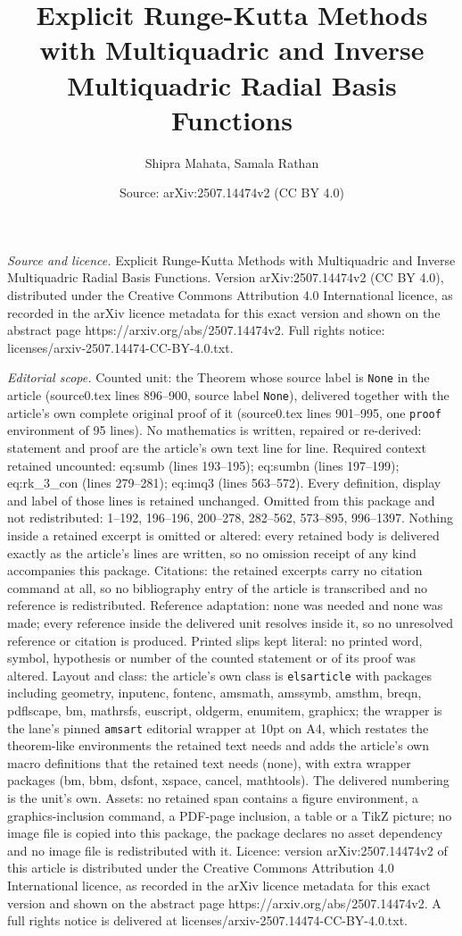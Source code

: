 \documentclass[10pt,a4paper]{amsart}
\title[Explicit Runge-Kutta Methods with Multiquadric and Inverse M]{Explicit Runge-Kutta Methods with Multiquadric and Inverse Multiquadric Radial Basis Functions}
\author{Shipra Mahata, Samala Rathan}
\date{Source: arXiv:2507.14474v2 (CC BY 4.0)}
\begin{document}
\maketitle

\noindent\emph{Source and licence.} Explicit Runge-Kutta Methods with Multiquadric and Inverse Multiquadric Radial Basis Functions. Version arXiv:2507.14474v2 (CC BY 4.0), distributed under the Creative Commons Attribution 4.0 International licence, as recorded in the arXiv licence metadata for this exact version and shown on the abstract page https://arxiv.org/abs/2507.14474v2. Full rights notice: licenses/arxiv-2507.14474-CC-BY-4.0.txt.\par\smallskip

\noindent\textit{Editorial scope.} Counted unit: the Theorem whose source label is \texttt{None} in the article (source0.tex lines 896--900, source label \texttt{None}), delivered together with the article's own complete original proof of it (source0.tex lines 901--995, one \texttt{proof} environment of 95 lines). No mathematics is written, repaired or re-derived: statement and proof are the article's own text line for line. Required context retained uncounted: eq:sumb (lines 193--195); eq:sumbn (lines 197--199); eq:rk\_3\_con (lines 279--281); eq:imq3 (lines 563--572). Every definition, display and label of those lines is retained unchanged. Omitted from this package and not redistributed: 1--192, 196--196, 200--278, 282--562, 573--895, 996--1397. Nothing inside a retained excerpt is omitted or altered: every retained body is delivered exactly as the article's lines are written, so no omission receipt of any kind accompanies this package. Citations: the retained excerpts carry no citation command at all, so no bibliography entry of the article is transcribed and no reference is redistributed. Reference adaptation: none was needed and none was made; every reference inside the delivered unit resolves inside it, so no unresolved reference or citation is produced. Printed slips kept literal: no printed word, symbol, hypothesis or number of the counted statement or of its proof was altered. Layout and class: the article's own class is \texttt{elsarticle} with packages including geometry, inputenc, fontenc, amsmath, amssymb, amsthm, breqn, pdflscape, bm, mathrsfs, euscript, oldgerm, enumitem, graphicx; the wrapper is the lane's pinned \texttt{amsart} editorial wrapper at 10pt on A4, which restates the theorem-like environments the retained text needs and adds the article's own macro definitions that the retained text needs (none), with extra wrapper packages (bm, bbm, dsfont, xspace, cancel, mathtools). The delivered numbering is the unit's own. Assets: no retained span contains a figure environment, a graphics-inclusion command, a PDF-page inclusion, a table or a TikZ picture; no image file is copied into this package, the package declares no asset dependency and no image file is redistributed with it. Licence: version arXiv:2507.14474v2 of this article is distributed under the Creative Commons Attribution 4.0 International licence, as recorded in the arXiv licence metadata for this exact version and shown on the abstract page https://arxiv.org/abs/2507.14474v2. A full rights notice is delivered at licenses/arxiv-2507.14474-CC-BY-4.0.txt. 
\end{document}
